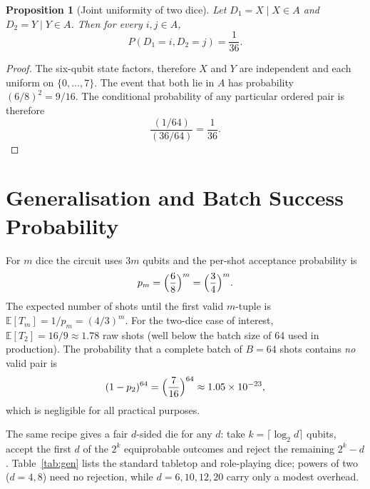 \documentclass{ieeeaccess}
\newtheorem{proposition}{Proposition}
\begin{document}
\begin{proposition}[Joint uniformity of two dice]\label{prop:joint}
Let $D_1=X\mid X\in A$ and $D_2=Y\mid Y\in A$. Then for every $i,j\in A$,
\begin{equation}
P(D_1=i,D_2=j)=\frac{1}{36}.
\end{equation}
\end{proposition}

\begin{proof}
The six-qubit state factors, therefore $X$ and $Y$ are independent and each uniform on $\{0,\dots,7\}$. The event that both lie in $A$ has probability $(6/8)^2=9/16$. The conditional probability of any particular ordered pair is therefore
\begin{equation}
\frac{(1/64)}{(36/64)}=\frac{1}{36}.
\end{equation}
\end{proof}

\section{Generalisation and Batch Success Probability}

For $m$ dice the circuit uses $3m$ qubits and the per-shot acceptance probability is
\begin{equation}
p_m = \Bigl(\frac{6}{8}\Bigr)^m = \Bigl(\frac{3}{4}\Bigr)^m.
\end{equation}
The expected number of shots until the first valid $m$-tuple is $\mathbb{E}[T_m]=1/p_m=(4/3)^m$. For the two-dice case of interest, $\mathbb{E}[T_2]=16/9\approx 1.78$ raw shots (well below the batch size of 64 used in production). The probability that a complete batch of $B=64$ shots contains \emph{no} valid pair is
\begin{equation}
(1-p_2)^{64}=\Bigl(\frac{7}{16}\Bigr)^{64}\approx 1.05\times 10^{-23},
\end{equation}
which is negligible for all practical purposes.

The same recipe gives a fair $d$-sided die for any $d$: take $k=\lceil\log_2 d\rceil$ qubits, accept the first $d$ of the $2^k$ equiprobable outcomes and reject the remaining $2^k-d$. Table~\ref{tab:gen} lists the standard tabletop and role-playing dice; powers of two ($d=4,8$) need no rejection, while $d=6,10,12,20$ carry only a modest overhead.
\end{document}
